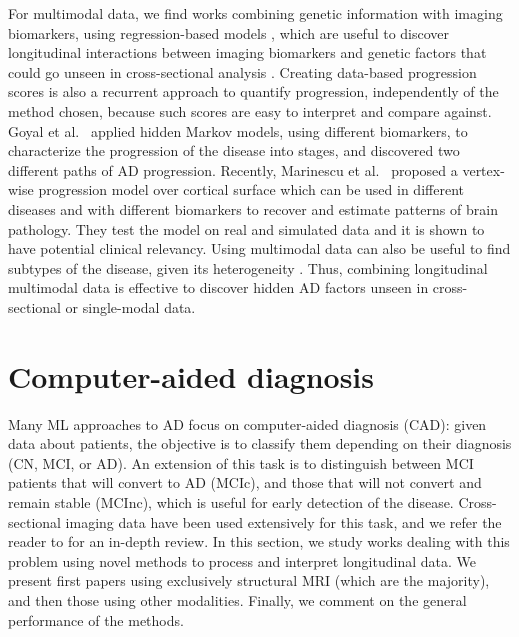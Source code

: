 For multimodal data, we find works combining genetic information with imaging biomarkers, using regression-based models \cite{Silver2012,Vounou2012}, which are useful to discover longitudinal interactions between imaging biomarkers and genetic factors that could go unseen in cross-sectional analysis \cite{Xu2014}. Creating data-based progression scores \cite{Casanova2018,Clark2012,Davatzikos2009,Jedynak2012,Schmidt-Richberg2015} is also a recurrent approach to quantify progression, independently of the method chosen, because such scores are easy to interpret and compare against. Goyal et al.\ \cite{Goyal2018b} applied hidden Markov models, using different biomarkers, to characterize the progression of the disease into stages, and discovered two different paths of AD progression. Recently, Marinescu et al.\ \cite{Marinescu2019} proposed a vertex-wise progression model over cortical surface which can be used in different diseases and with different biomarkers to recover and estimate patterns of brain pathology. They test the model on real and simulated data and it is shown to have potential clinical relevancy. Using multimodal data can also be useful to find subtypes of the disease, given its heterogeneity \cite{Gamberger2017}. Thus, combining longitudinal multimodal data is effective to discover hidden AD factors unseen in cross-sectional or single-modal data. \\

\section{Computer-aided diagnosis}
\label{sec:classification}

Many ML approaches to AD focus on computer-aided diagnosis (CAD): given data about patients, the objective is to classify them depending on their diagnosis (CN, MCI, or AD). An extension of this task is to distinguish between MCI patients that will convert to AD (MCIc), and those that will not convert and remain stable (MCInc), which is useful for early detection of the disease. Cross-sectional imaging data have been used extensively for this task, and we refer the reader to \cite{Rathore2017} for an in-depth review. In this section, we study works dealing with this problem using novel methods to process and interpret longitudinal data. We present first papers using exclusively structural MRI (which are the majority), and then those using other modalities. Finally, we comment on the general performance of the methods. \\

